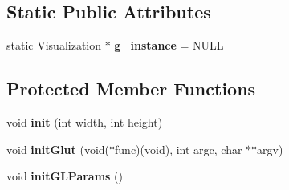 \subsection*{Static Public Attributes}
\begin{DoxyCompactItemize}
\item 
\hypertarget{classCartWheel_1_1Visualization_a55d04209c175b357abc9b0dba69f81c8}{
static \hyperlink{classCartWheel_1_1Visualization}{Visualization} $\ast$ {\bfseries g\_\-instance} = NULL}
\label{classCartWheel_1_1Visualization_a55d04209c175b357abc9b0dba69f81c8}

\end{DoxyCompactItemize}
\subsection*{Protected Member Functions}
\begin{DoxyCompactItemize}
\item 
\hypertarget{classCartWheel_1_1Visualization_aa7449c675862e5eaa0b08f5c1a9ec37b}{
void {\bfseries init} (int width, int height)}
\label{classCartWheel_1_1Visualization_aa7449c675862e5eaa0b08f5c1a9ec37b}

\item 
\hypertarget{classCartWheel_1_1Visualization_a08ceb923e60859ebcc56155137be9163}{
void {\bfseries initGlut} (void($\ast$func)(void), int argc, char $\ast$$\ast$argv)}
\label{classCartWheel_1_1Visualization_a08ceb923e60859ebcc56155137be9163}

\item 
\hypertarget{classCartWheel_1_1Visualization_ac03cfaaac46f1928a16274a1f7b1879d}{
void {\bfseries initGLParams} ()}
\label{classCartWheel_1_1Visualization_ac03cfaaac46f1928a16274a1f7b1879d}

\end{DoxyCompactItemize}
